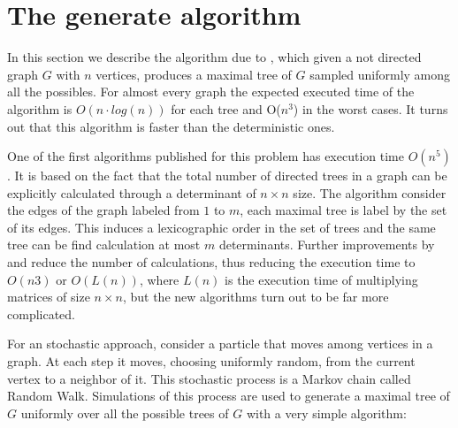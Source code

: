 
\chapter{The generate algorithm} %

\label{AppendixA} %


In this section we describe the algorithm due to \cite{Broder89}, which given a not directed graph $G$ with $n$ vertices, produces a maximal tree of $G$ sampled uniformly among all the possibles. For almost every graph the expected executed time of the algorithm is $O(n\cdot log(n) )$ for each tree and O($n^{3}$) in the worst cases. It turns out that this algorithm is faster than the deterministic ones.

One of the first algorithms published for this problem has execution time $O (n^{5})$. It is based on the fact that the total number of directed trees in a graph can be explicitly calculated through a determinant of $n \times n$ size. The algorithm consider the edges of the graph labeled from $1$ to $m$, each maximal tree is label by the set of its edges. This induces a lexicographic order in the set of trees and the same tree can be find calculation at most $m$ determinants. Further improvements by \cite{CDN88} and \cite{CDM88} reduce the number of calculations, thus reducing the execution time to $O(n3)$ or $O(L(n))$, where $L(n)$ is the execution time of multiplying matrices of size $n\times n$, but the new algorithms turn out to be far more complicated.

For an stochastic approach, consider a particle that moves among vertices in a graph. At each step it moves, choosing uniformly random, from the current vertex to a neighbor of it. This stochastic process is a Markov chain called Random Walk. Simulations of this process are used to generate a maximal tree of $G$ uniformly over all the possible trees of $G$ with a very simple algorithm:


